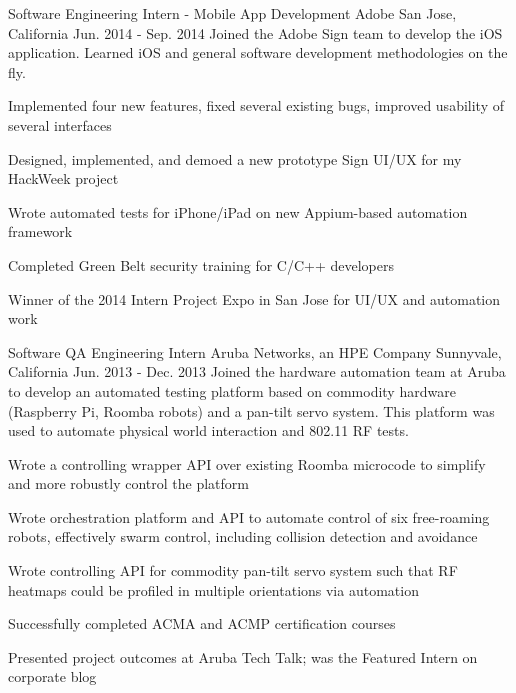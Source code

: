 \begin{cventries}
\cventry
    {Software Engineering Intern - Mobile App Development} %
    {Adobe} %
    {San Jose, California} %
    {Jun. 2014 - Sep. 2014} %
    {Joined the Adobe Sign team to develop the iOS application. Learned iOS and general software development methodologies on the fly.} %
    {
      \begin{cvitems} %
        \item {Implemented four new features, fixed several existing bugs, improved usability of several interfaces}
        \item {Designed, implemented, and demoed a new prototype Sign UI/UX for my HackWeek project}
        \item {Wrote automated tests for iPhone/iPad on new Appium-based automation framework}
        \item {Completed Green Belt security training for C/C++ developers}
        \item {Winner of the 2014 Intern Project Expo in San Jose for UI/UX and automation work}
      \end{cvitems}
    }

\cventry
    {Software QA Engineering Intern} %
    {Aruba Networks, an HPE Company} %
    {Sunnyvale, California} %
    {Jun. 2013 - Dec. 2013} %
    {Joined the hardware automation team at Aruba to develop an automated testing platform based on commodity hardware (Raspberry Pi, Roomba robots) and a pan-tilt servo system. This platform was used to automate physical world interaction and 802.11 RF tests.} %
    {
      \begin{cvitems} %
        \item {Wrote a controlling wrapper API over existing Roomba microcode to simplify and more robustly control the platform}
        \item {Wrote orchestration platform and API to automate control of six free-roaming robots, effectively swarm control, including collision detection and avoidance}
        \item {Wrote controlling API for commodity pan-tilt servo system such that RF heatmaps could be profiled in multiple orientations via automation}
        \item {Successfully completed ACMA and ACMP certification courses}
        \item {Presented project outcomes at Aruba Tech Talk; was the Featured Intern on corporate blog}
      \end{cvitems}
    }


\end{cventries}

